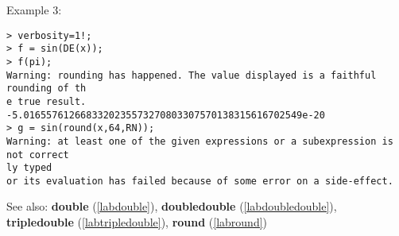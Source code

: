 \noindent Example 3: 
\begin{center}\begin{minipage}{15cm}\begin{Verbatim}[frame=single]
> verbosity=1!;
> f = sin(DE(x));
> f(pi);
Warning: rounding has happened. The value displayed is a faithful rounding of th
e true result.
-5.0165576126683320235573270803307570138315616702549e-20
> g = sin(round(x,64,RN));
Warning: at least one of the given expressions or a subexpression is not correct
ly typed
or its evaluation has failed because of some error on a side-effect.
\end{Verbatim}
\end{minipage}\end{center}
See also: \textbf{double} (\ref{labdouble}), \textbf{doubledouble} (\ref{labdoubledouble}), \textbf{tripledouble} (\ref{labtripledouble}), \textbf{round} (\ref{labround})
